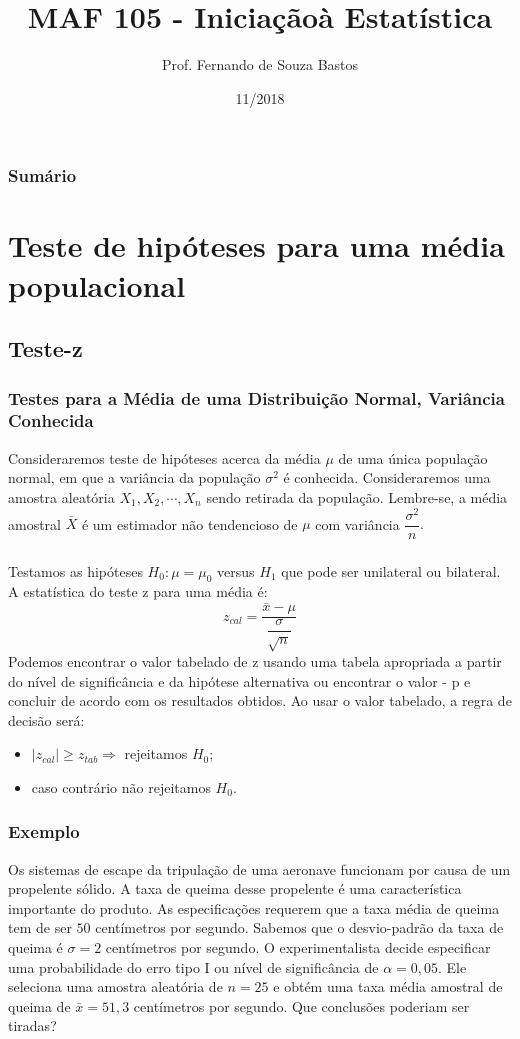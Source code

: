 \documentclass[14pt,aspectratio=1610]{beamer}
\title{MAF 105 - Iniciaçãoà Estatística}
\author{Prof. Fernando de Souza Bastos}
\institute{Instituto de Ciências Exatas e Tecnológicas\texorpdfstring{\\ Universidade Federal de Viçosa}{}\texorpdfstring{\\ Campus UFV - Florestal}{}}
\date{11/2018}
\newcommand{\bx}{\ensuremath{\bar{x}}}
\newcommand{\Ho}{\ensuremath{H_{0}}}
\newcommand{\Hi}{\ensuremath{H_{1}}}
\begin{document}


\frame{\titlepage}

\begin{frame}{}
\frametitle{\bf Sumário}
\tableofcontents
\end{frame}
\section{Teste de hipóteses para uma média populacional}
\subsection{Teste-z}
\begin{frame}{}
\frametitle{Testes para a Média de uma Distribuição Normal, Variância Conhecida}
\begin{block}{}
\justifying
Consideraremos teste de hipóteses acerca da média $\mu$ de uma única população normal, em que a variância da população $\sigma^{2}$ é conhecida. Consideraremos uma amostra aleatória $X_{1}, X_{2},\cdots, X_{n}$ sendo retirada da população. Lembre-se, a média amostral $\bar{X}$ é um estimador não tendencioso de $\mu$ com 
variância $\dfrac{\sigma^{2}}{n}.$
\end{block}
\end{frame}

\begin{frame}{}
\frametitle{}
\begin{block}{}
\justifying
Testamos as hipóteses $\Ho:\mu=\mu_{0}$ versus $\Hi$ que pode ser unilateral ou bilateral. A estatística do teste z para uma média é:
$$z_{cal}=\dfrac{\bx-\mu}{\dfrac{\sigma}{\sqrt{n}}}$$
Podemos encontrar o valor tabelado de z usando uma tabela apropriada a partir do nível de significância e da hipótese alternativa ou 
encontrar o valor - p e concluir de acordo com os resultados obtidos. Ao usar o valor tabelado, a regra de decisão será:
\begin{itemize}
\item $|z_{cal}|\geq z_{tab}\Rightarrow$ rejeitamos $\Ho;$
\item caso contrário não rejeitamos $\Ho.$
\end{itemize}
\end{block}
\end{frame}

\begin{frame}{}
\frametitle{Exemplo}
\begin{block}{}
\justifying
Os sistemas de escape da tripulação de uma aeronave funcionam por causa de um propelente sólido. A taxa de queima desse propelente é uma característica importante 
do produto. As especificações requerem que a taxa média de queima tem de ser $50$ centímetros por segundo. Sabemos que o desvio-padrão da taxa de queima é 
$\sigma = 2$ centímetros por segundo. O experimentalista decide especificar uma probabilidade do erro tipo I ou nível de significância de $\alpha = 0,05.$ Ele seleciona 
uma amostra aleatória de $n = 25$ e obtém uma taxa média amostral de queima de $\bx = 51,3$ centímetros por segundo. Que conclusões poderiam ser tiradas?
\end{block}
\end{frame}
\end{document}
